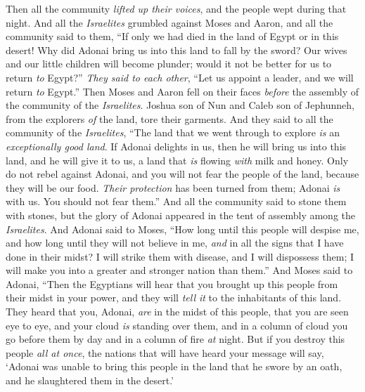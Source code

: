 \begin{biblechapter} %
 Then all the community \textit{lifted up their voices}, and the people wept during that night.
\verse And all the \textit{Israelites} grumbled against Moses and Aaron, and all the community said to them, “If only we had died in the land of Egypt or in this desert!
\verse Why did Adonai bring us into this land to fall by the sword? Our wives and our little children will become plunder; would it not be better for us to return \textit{to} Egypt?”
\verse \textit{They said to each other}, “Let us appoint a leader, and we will return \textit{to} Egypt.”
\verse Then Moses and Aaron fell on their faces \textit{before} the assembly of the community of the \textit{Israelites}.
\verse Joshua son of Nun and Caleb son of Jephunneh, from the explorers \textit{of} the land, tore their garments.
\verse And they said to all the community of the \textit{Israelites}, “The land that we went through to explore \textit{is} an \textit{exceptionally good land}.
\verse If Adonai delights in us, then he will bring us into this land, and he will give it to us, a land that \textit{is} flowing \textit{with} milk and honey.
\verse Only do not rebel against Adonai, and you will not fear the people of the land, because they will be our food. \textit{Their protection} has been turned from them; Adonai \textit{is} with us. You should not fear them.”
\verse And all the community said to stone them with stones, but the glory of Adonai appeared in the tent of assembly among the \textit{Israelites}.
\verse And Adonai said to Moses, “How long until this people will despise me, and how long until they will not believe in me, \textit{and} in all the signs that I have done in their midst?
\verse I will strike them with disease, and I will dispossess them; I will make you into a greater and stronger nation than them.”
\verse And Moses said to Adonai, “Then the Egyptians will hear that you brought up this people from their midst in your power,
\verse and they will \textit{tell it} to the inhabitants of this land. They heard that you, Adonai, \textit{are} in the midst of this people, that you are seen eye to eye, and your cloud \textit{is} standing over them, and in a column of cloud you go before them by day and in a column of fire \textit{at} night.
\verse But if you destroy this people \textit{all at once}, the nations that will have heard your message will say,
\verse ‘Adonai was unable to bring this people in the land that he swore by an oath, and he slaughtered them in the desert.’

\end{biblechapter}
